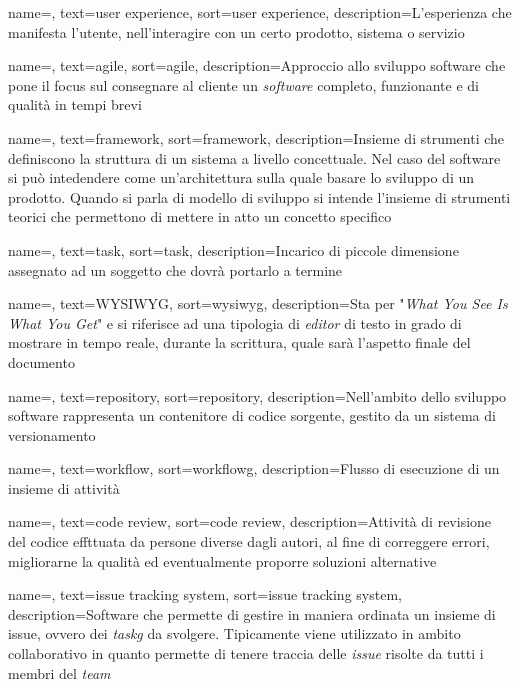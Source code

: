 {
    name=,
    text=user experience,
    sort=user experience,
    description={L'esperienza che manifesta l'utente, nell'interagire con un certo prodotto, sistema o servizio}
}

{
    name=,
    text=agile,
    sort=agile,
    description={Approccio allo sviluppo software che pone il focus sul consegnare al cliente un \textit{software} completo, funzionante  e di qualità in tempi brevi}
}

{
    name=,
    text=framework,
    sort=framework,
    description={Insieme di strumenti che definiscono la struttura di un sistema a livello concettuale. Nel caso del software si può intedendere come un'architettura sulla quale basare lo sviluppo di un prodotto. Quando si parla di modello di sviluppo si intende l'insieme di strumenti teorici che permettono di mettere in atto un concetto specifico}
}

{
    name=,
    text=task,
    sort=task,
    description={Incarico di piccole dimensione assegnato ad un soggetto che dovrà portarlo a termine}
}

{
    name=,
    text=WYSIWYG,
    sort=wysiwyg,
    description={Sta per "\textit{What You See Is What You Get}" e si riferisce ad una tipologia di \textit{editor} di testo in grado di mostrare in tempo reale, durante la scrittura, quale sarà l'aspetto finale del documento}
}

{
    name=,
    text=repository,
    sort=repository,
    description={Nell'ambito dello sviluppo software rappresenta un contenitore di codice sorgente, gestito da un sistema di versionamento}
}

{
    name=,
    text=workflow,
    sort=workflowg,
    description={Flusso di esecuzione di un insieme di attività}
}

{
    name=,
    text=code review,
    sort=code review,
    description={Attività di revisione del codice effttuata da persone diverse dagli autori, al fine di correggere errori, migliorarne la qualità ed eventualmente proporre soluzioni alternative}
}

{
    name=,
    text=issue tracking system,
    sort=issue tracking system,
    description={Software che permette di gestire in maniera ordinata un insieme di issue, ovvero dei \textit{\gls{taskg}} da svolgere. Tipicamente viene utilizzato in ambito collaborativo in quanto permette di tenere traccia delle \textit{issue} risolte da tutti i membri del \textit{team}}
}

